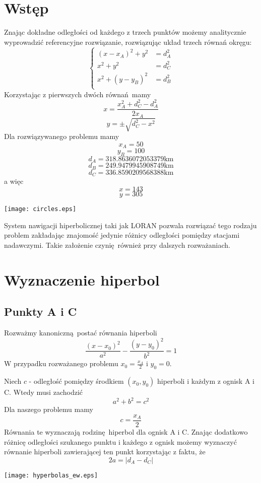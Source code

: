\documentclass[11pt]{article}
\begin{document}
\section{Wstęp}
Znając dokładne odległości od każdego z trzech punktów możemy analitycznie
wyprowadzić referencyjne rozwiązanie, rozwiązując układ trzech równań okręgu:
\[
    \begin{cases}
        (x - x_A)^2 + y^2 &= d_A^2 \\
        x^2 + y^2 &= d_C^2 \\
        x^2 + (y-y_B)^2 &= d_B^2 \\
    \end{cases}
\]
Korzystając z pierwszych dwóch równań mamy
\[ x = \frac{x_A^2 + d_C^2 - d_A^2}{2x_A} \]
\[ y = \pm \sqrt{d_C^2 - x^2} \]
Dla rozwiązywanego problemu mamy
\[ x_A = 50 \]
\[ y_B = 100 \]
\[ d_A = 318.8636072053379\mbox{km} \]
\[ d_B = 249.9479945908749\mbox{km} \]
\[ d_C = 336.8590209568388\mbox{km} \]
a więc 
\[ x = 143 \]
\[ y = 305 \]

\texttt{[image: circles.eps]}

System nawigacji hiperbolicznej taki jak LORAN pozwala rozwiązać tego rodzaju
problem zakładając znajomość jedynie różnicy odległości pomiędzy stacjami
nadawczymi.  Takie założenie czynię również przy dalszych rozważaniach.


\section{Wyznaczenie hiperbol}
\subsection{Punkty A i C}
Rozważmy kanoniczną postać równania hiperboli
\[ \frac{(x-x_0)^2}{a^2} - \frac{(y-y_0)^2}{b^2} = 1 \]
W przypadku rozważanego problemu $x_0 = \frac{x_A}{2}$ i $y_0 = 0$.

Niech $c$ - odległość pomiędzy środkiem $(x_0, y_0)$ hiperboli i każdym z ognisk
A i C.  Wtedy musi zachodzić
\[ a^2 + b^2 = c^2 \]
Dla naszego problemu mamy
\[ c = \frac{x_A}{2} \]
Równania te wyznaczają rodzinę hiperbol dla ognisk A i C.  Znając dodatkowo
różnicę odległości szukanego punktu i każdego z ognisk możemy wyznaczyć równanie
hiperboli zawierającej ten punkt korzystając z faktu, że
\[ 2a = |d_A - d_C| \]

\texttt{[image: hyperbolas\_ew.eps]}
\end{document}
